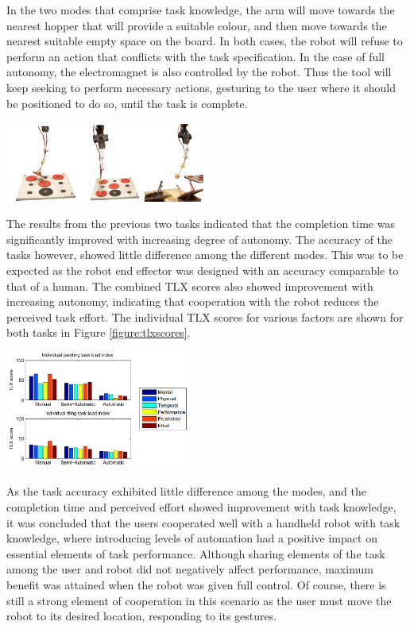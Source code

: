 \documentclass[11pt]{article}
\begin{document}
In the two modes that comprise task knowledge, the arm will move towards the nearest hopper that will provide a suitable colour, and then move towards the nearest suitable empty space on the board. In both cases, the robot will refuse to perform an action that conflicts with the task specification. In the case of full autonomy, the electromagnet is also controlled by the robot. Thus the tool will keep seeking to perform necessary actions, gesturing to the user where it should be positioned to do so, until the task is complete.

\begin{center}
\includegraphics[width=0.5\textwidth]{tilingtask.png}
\label{figure:tilingtask}
\end{center}

The results from the previous two tasks indicated that the completion time was significantly improved with increasing degree of autonomy. The accuracy of the tasks however, showed little difference among the different modes. This was to be expected as the robot end effector was designed with an accuracy comparable to that of a human. The combined TLX scores also showed improvement with increasing autonomy, indicating that cooperation with the robot reduces the perceived task effort. The individual TLX scores for various factors are shown for both tasks in Figure \ref{figure:tlxscores}.

\begin{center}
\includegraphics[width = 0.455\textwidth]{tlxscores.png}
\label{figure:tlxscores}
\end{center}

As the task accuracy exhibited little difference among the modes, and the completion time and perceived effort showed improvement with task knowledge, it was concluded that the users cooperated well with a handheld robot with task knowledge, where introducing levels of automation had a positive impact on essential elements of task performance. Although sharing elements of the task among the user and robot did not negatively affect performance, maximum benefit was attained when the robot was given full control. Of course, there is still a strong element of cooperation in this scenario as the user must move the robot to its desired location, responding to its gestures.
	
\end{document}
